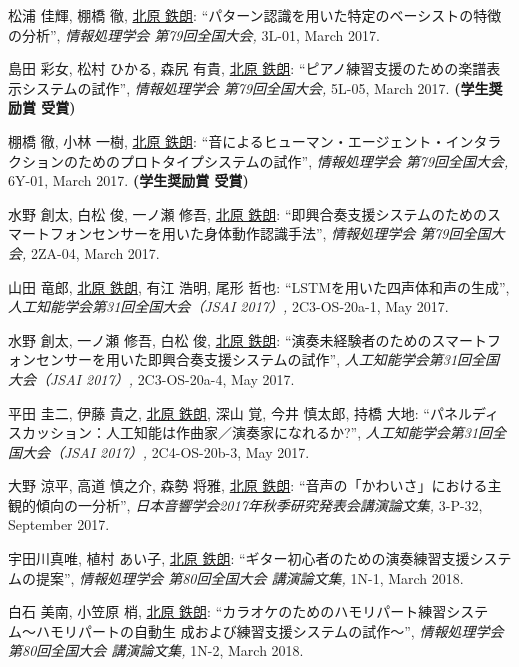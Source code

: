 \begin{Enumerate}
\item 
松浦 佳輝, 
棚橋 徹, 
\underline{北原 鉄朗}: 
    ``パターン認識を用いた特定のベーシストの特徴の分析'', 
    {\it 情報処理学会 第79回全国大会,
    } 3L-01, March 2017. 

\item 
島田 彩女, 
松村 ひかる, 
森尻 有貴, 
\underline{北原 鉄朗}: 
    ``ピアノ練習支援のための楽譜表示システムの試作'', 
    {\it 情報処理学会 第79回全国大会,
    } 5L-05, March 2017. 
{\bf (学生奨励賞 受賞)}
\item 
棚橋 徹, 
小林 一樹, 
\underline{北原 鉄朗}: 
    ``音によるヒューマン・エージェント・インタラクションのためのプロトタイプシステムの試作'', 
    {\it 情報処理学会 第79回全国大会,
    } 6Y-01, March 2017. 
{\bf (学生奨励賞 受賞)}
\item 
水野 創太, 
白松 俊, 
一ノ瀬 修吾, 
\underline{北原 鉄朗}: 
    ``即興合奏支援システムのためのスマートフォンセンサーを用いた身体動作認識手法'', 
    {\it 情報処理学会 第79回全国大会,
    } 2ZA-04, March 2017. 

\item 
山田 竜郎, 
\underline{北原 鉄朗}, 
有江 浩明, 
尾形 哲也: 
    ``LSTMを用いた四声体和声の生成'', 
    {\it 人工知能学会第31回全国大会（JSAI 2017）,
    } 2C3-OS-20a-1, May 2017. 

\item 
水野 創太, 
一ノ瀬 修吾, 
白松 俊, 
\underline{北原 鉄朗}: 
    ``演奏未経験者のためのスマートフォンセンサーを用いた即興合奏支援システムの試作'', 
    {\it 人工知能学会第31回全国大会（JSAI 2017）,
    } 2C3-OS-20a-4, May 2017. 

\item 
平田 圭二, 
伊藤 貴之, 
\underline{北原 鉄朗}, 
深山 覚, 
今井 慎太郎, 
持橋 大地: 
    ``パネルディスカッション：人工知能は作曲家／演奏家になれるか?'', 
    {\it 人工知能学会第31回全国大会（JSAI 2017）,
    } 2C4-OS-20b-3, May 2017. 

\item 
大野 涼平, 
高道 慎之介, 
森勢 将雅, 
\underline{北原 鉄朗}: 
    ``音声の「かわいさ」における主観的傾向の一分析'', 
    {\it 日本音響学会2017年秋季研究発表会講演論文集,
    } 3-P-32, September 2017. 

\item 
宇田川真唯, 
植村 あい子, 
\underline{北原 鉄朗}: 
    ``ギター初心者のための演奏練習支援システムの提案'', 
    {\it 情報処理学会 第80回全国大会 講演論文集,
    } 1N-1, March 2018. 

\item 
白石 美南, 
小笠原 梢, 
\underline{北原 鉄朗}: 
    ``カラオケのためのハモリパート練習システム〜ハモリパートの自動生 成および練習支援システムの試作〜'', 
    {\it 情報処理学会 第80回全国大会 講演論文集,
    } 1N-2, March 2018. 


\end{Enumerate}
